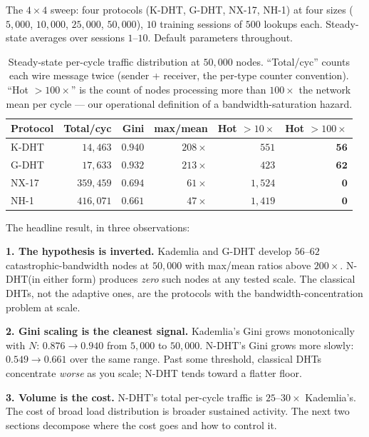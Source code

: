 \documentclass[twoside,nobib]{tufte-book}
\newcommand{\NDHT}{N-DHT\xspace}
\newcommand{\KDHT}{K-DHT\xspace}
\newcommand{\GDHT}{G-DHT\xspace}
\begin{document}
The $4 \times 4$ sweep: four protocols (\KDHT, \GDHT, NX-17,
NH-1) at four sizes ($5{,}000$, $10{,}000$, $25{,}000$,
$50{,}000$), $10$ training sessions of $500$ lookups each.
Steady-state averages over sessions $1$--$10$. Default parameters
throughout.

\begin{table}[t]
\centering
\small
\caption{Steady-state per-cycle traffic distribution at
$50{,}000$ nodes. ``Total/cyc'' counts each wire message twice
(sender + receiver, the per-type counter convention). ``Hot
$>100\times$'' is the count of nodes processing more than
$100\times$ the network mean per cycle --- our operational
definition of a bandwidth-saturation hazard.}
\label{tab:bw-50K}
\begin{tabular}{@{}lrrrrr@{}}
\toprule
\textbf{Protocol} & \textbf{Total/cyc} & \textbf{Gini} &
\textbf{max/mean} & \textbf{Hot $>10\times$} & \textbf{Hot $>100\times$} \\
\midrule
\KDHT  & $14{,}463$ & $\mathbf{0.940}$ & $208\times$ & $551$ & $\mathbf{56}$ \\
\GDHT  & $17{,}633$ & $\mathbf{0.932}$ & $213\times$ & $423$ & $\mathbf{62}$ \\
NX-17  & $359{,}459$ & $0.694$ & $61\times$ & $1{,}524$ & $\mathbf{0}$ \\
NH-1   & $416{,}071$ & $0.661$ & $47\times$ & $1{,}419$ & $\mathbf{0}$ \\
\bottomrule
\end{tabular}
\end{table}

The headline result, in three observations:

\textbf{1. The hypothesis is inverted.} Kademlia and \GDHT
develop $56$--$62$ catastrophic-bandwidth nodes at $50{,}000$
with max/mean ratios above $200\times$. \NDHT (in either form)
produces \emph{zero} such nodes at any tested scale. The
classical DHTs, not the adaptive ones, are the protocols with
the bandwidth-concentration problem at scale.

\textbf{2. Gini scaling is the cleanest signal.} Kademlia's
Gini grows monotonically with $N$: $0.876 \to 0.940$ from
$5{,}000$ to $50{,}000$. \NDHT's Gini grows more slowly:
$0.549 \to 0.661$ over the same range. Past some threshold,
classical DHTs concentrate \emph{worse} as you scale; \NDHT
tends toward a flatter floor.

\textbf{3. Volume is the cost.} \NDHT's total per-cycle
traffic is $25$--$30 \times$ Kademlia's. The cost of broad load
distribution is broader sustained activity. The next two
sections decompose where the cost goes and how to control it.
\end{document}
